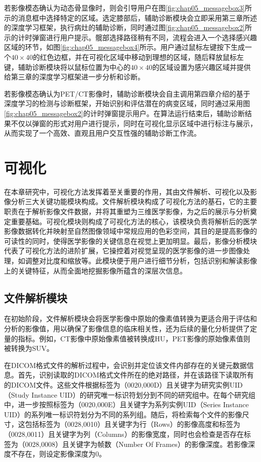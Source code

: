 若影像模态确认为动态骨显像时，则会引导用户在图\ref{fig:chap05_messagebox3}所示的消息框中选择特定的区域。选定膝部后，辅助诊断模块会立即采用第三章所述的深度学习框架，执行病灶的辅助诊断，同时通过图\ref{fig:chap05_messagebox2}所示的计时弹窗进行用户提示。髋部选择路径稍有不同，流程会进入一个选择感兴趣区域的环节，如图\ref{fig:chap05_messagebox4}所示。用户通过鼠标左键按下生成一个\(40 \times 40\)的红色边框，并在可视化区域中移动到理想的区域，随后释放鼠标左键，辅助诊断模块将以鼠标位置为中心的\(40 \times40 \)的区域设置为感兴趣区域并提供给第三章的深度学习框架进一步分析和诊断。

若影像模态确认为PET/CT影像时，辅助诊断模块会自主调用第四章介绍的基于深度学习的检测与诊断框架，开始识别和评估潜在的病变区域，同时通过采用图\ref{fig:chap05_messagebox2}的计时弹窗提示用户。在算法运行结束后，辅助诊断结果不仅以弹窗的形式对用户进行提示，同时在可视化显示区域中进行标注与展示，从而实现了一个高效、直观且用户交互性强的辅助诊断工作流。

\section{可视化}

在本章研究中，可视化方法发挥着至关重要的作用，其由文件解析、可视化以及影像分析三大关键功能模块构成。文件解析模块构成了可视化方法的基石，它的主要职责在于解析影像文件数据，并将其重塑为三维医学影像，为之后的展示与分析奠定重要基础。可视化模块则构成了可视化方法的核心，该模块负责将解析后的医学影像数据转化并映射至自然图像领域中常规应用的色彩空间，其目的是提高影像的可读性的同时，使得医学影像的关键信息在视觉上更加明显。最后，影像分析模块代表了可视化方法的进阶扩展，它操控着对视觉呈现的医学影像的进一步图像处理，如调整对比度和缩放等。此模块便于用户进行细节分析，包括识别和解读影像上的关键特征，从而全面地挖掘影像所蕴含的深层次信息。

\subsection{文件解析模块}

在初始阶段，文件解析模块会将医学影像中原始的像素值转换为更适合用于评估和分析的影像值，用以确保了影像信息的临床相关性，还为后续的量化分析提供了定量的指标。例如，CT影像中原始像素值被转换成HU，PET影像的原始像素值则被转换为SUV。

在DICOM格式文件的解析过程中，会识别并定位该文件内部存在的关键元数据信息。首先，识别读取的DICOM格式文件所在的绝对路径，并在该路径下读取所有的DICOM文件。这些文件根据标签为（0020,000D）且关键字为研究实例UID（Study Instance UID）的研究唯一标识符划分到不同的研究组中。在每个研究组中，进一步按照标签为（0020,000E）且关键字为系列实例UID（Series Instance UID）的系列唯一标识符划分为不同的系列组。随后，将检索每个文件的影像尺寸，这包括标签为（0028,0010）且关键字为行（Rows）的影像高度和标签为（0028,0011）且关键字为列（Columns）的影像宽度，同时也会检查是否存在标签为（0028,0008）且关键字为帧数（Number Of Frames）的影像深度。若影像深度不存在，则设定影像深度为0。

